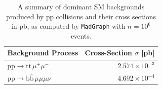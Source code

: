 \begin{table}[]
  \begin{tabular}{l r}
    \hline
    {Background Process} & {Cross-Section $\sigma$ [\textrm{pb}]} \\
    \hline
   $\mathrm{pp} \to \mathrm{t} \overline{\mathrm{t}} \, \mu^+ \mu^-$ & $2.574\times 10^{-3}$  \\
    $\mathrm{pp} \to \mathrm{b}\overline{\mathrm{b}}\, \mu\mu\mu\nu $ & $4.692 \times 10^{-4}$ \\
    \hline
  \end{tabular}
  \centering
  \caption{A summary of dominant SM backgrounds produced by $\mathrm{pp}$ collisions and their cross sections in pb, as computed by \texttt{MadGraph} with $n = 10^6$ events.}
  \label{tab:dominantbkgs}
\end{table}


